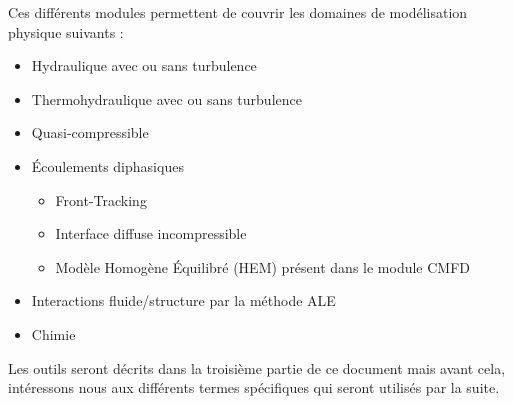 Ces différents modules permettent de couvrir les domaines de modélisation physique suivants :
\begin{itemize}[label=$\Rightarrow$, font=\LARGE]
  \item Hydraulique avec ou sans turbulence
  \item Thermohydraulique avec ou sans turbulence
  \item Quasi-compressible
  \item Écoulements diphasiques
  \begin{itemize}
    \item Front-Tracking
    \item Interface diffuse incompressible
    \item Modèle Homogène Équilibré (HEM) pr\'esent dans le module CMFD
  \end{itemize}
  \item Interactions fluide/structure par la méthode ALE
  \item Chimie
\end{itemize}

Les outils seront décrits dans la troisième partie de ce document mais avant cela, intéressons nous aux différents termes spécifiques qui seront utilisés par la suite.
